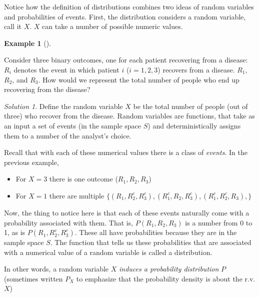 \documentclass[
  letterpaper,
]{book}
\providecommand{\tightlist}{%
  \setlength{\itemsep}{0pt}\setlength{\parskip}{0pt}}\usepackage{longtable,booktabs,array}
\theoremstyle{definition}
\theoremstyle{definition}
\newtheorem{example}{Example}[chapter]
\theoremstyle{plain}
\theoremstyle{definition}
\theoremstyle{plain}
\theoremstyle{plain}
\theoremstyle{remark}
\newtheorem*{solution}{Solution}
\begin{document}
Notice how the definition of distributions combines two ideas of random
variables and probabilities of events. First, the distribution considers
a random variable, call it \(X\). \(X\) can take a number of possible
numeric values.

\leavevmode{}%
\begin{example}[]\label{exm-}

Consider three binary outcomes, one for each patient recovering from a
disease: \(R_i\) denotes the event in which patient \(i\)
(\(i = 1, 2, 3\)) recovers from a disease. \(R_1\), \(R_2\), and
\(R_3\). How would we represent the total number of people who end up
recovering from the disease?

\end{example}

\begin{solution}

Define the random variable \(X\) be the total number of people (out of
three) who recover from the disease. Random variables are functions,
that take as an input a set of events (in the sample space \(S\)) and
deterministically assigns them to a number of the analyst's choice.

Recall that with each of these numerical values there is a class of
\emph{events}. In the previous example,

\begin{itemize}
\tightlist
\item
  For \(X = 3\) there is one outcome (\(R_1, R_2, R_3\))
\item
  For \(X = 1\) there are multiple
  \(\{(R_1, R_2^c, R_3^c), (R_1^c, R_2, R_3^c), (R_1^c, R_2^c, R_3), \}\)
\end{itemize}

Now, the thing to notice here is that each of these events naturally
come with a probability associated with them. That is,
\(P(R_1, R_2, R_3)\) is a number from 0 to 1, as is
\(P(R_1, R_2^c, R_3^c)\). These all have probabilities because they are
in the sample space \(S\). The function that tells us these
probabilities that are associated with a numerical value of a random
variable is called a distribution.

In other words, a random variable \(X\) \emph{induces a probability
distribution} \(P\) (sometimes written \(P_X\) to emphasize that the
probability density is about the r.v. \(X\))

\end{solution}
\end{document}

